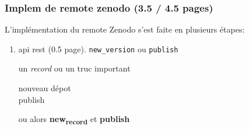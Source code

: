 \documentclass[11pt]{article}
\begin{document}
\subsubsection{Implem de remote zenodo (3.5 / 4.5 pages)}
\label{sec:org255f1ad}
L'implémentation du remote Zenodo s'est faite en plusieurs étapes:
\begin{enumerate}
\item api rest (0.5 page).
\label{sec:org73127b3}
\texttt{new\_version} ou \texttt{publish}

un \emph{record} ou un truc important

\begin{description}
\item[{nouveau dépot}] 

\item[{publish}] 
\end{description}

ou alors \textbf{new\textsubscript{record}} et \textbf{publish}



\end{enumerate}
\end{document}
